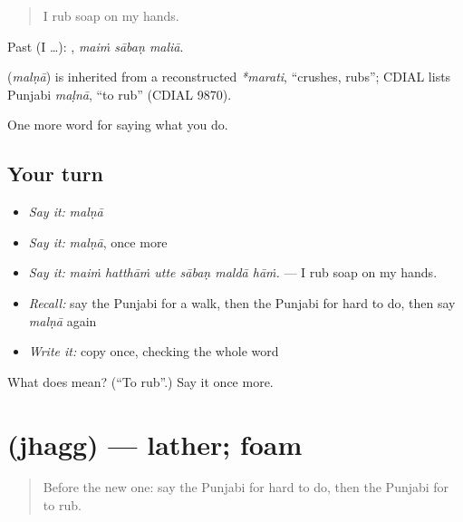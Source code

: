 \begin{quote}
I rub soap on my hands.
\end{quote}

Past (I …):   , \emph{maiṁ sābaṇ maliā}.

\begin{cousinweb}
\textbf{} (\emph{malṇā}) is inherited from a reconstructed \emph{*marati}, \textquotedblleft{}crushes, rubs\textquotedblright{}; CDIAL lists Punjabi \emph{maḷnā}, \textquotedblleft{}to rub\textquotedblright{} (CDIAL 9870).
\end{cousinweb}

\begin{grammarlens}[title={What you've built}]
One more word for saying what you do.
\end{grammarlens}

\subsection*{Your turn}
\begin{itemize}
\raggedright
  \item \emph{Say it:} \emph{malṇā}
  \item \emph{Say it:} \emph{malṇā}, once more
  \item \emph{Say it:} \emph{maiṁ hatthāṁ utte sābaṇ maldā hāṁ.} — I rub soap on my hands.
  \item \emph{Recall:} say the Punjabi for a walk, then the Punjabi for hard to do, then say \emph{malṇā} again
  \item \emph{Write it:} copy \textbf{} once, checking the whole word
\end{itemize}

\begin{tcolorbox}[breakable,colback=teal!4,colframe=teal!35!black,title={Before you move on}]
What does  mean? (\textquotedblleft{}To rub\textquotedblright{}.) Say it once more.
\end{tcolorbox}
\section[\texorpdfstring{\pa{ਝੱਗ} (jhagg)}{ਝੱਗ (jhagg)}]{ (jhagg) — lather; foam}

\label{lesson:PA-C227-jhagg}



\begin{quote}
Before the new one: say the Punjabi for hard to do, then the Punjabi for to rub.
\end{quote}

